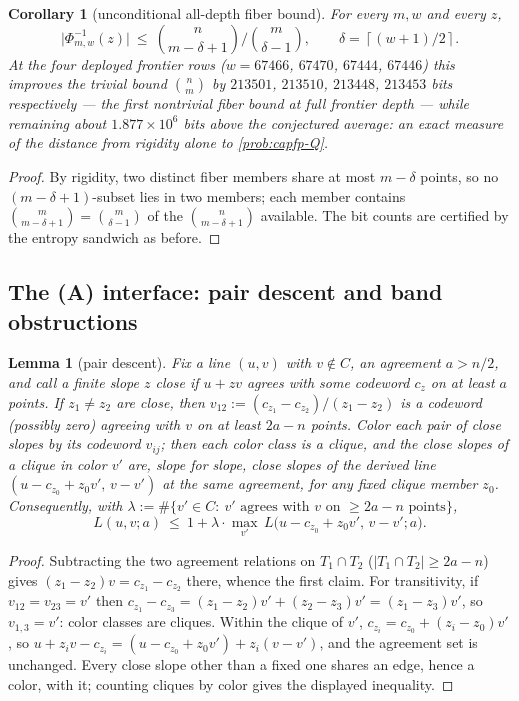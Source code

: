 \documentclass[11pt]{article}
\newtheorem{lemma}[lemma]{Lemma}
\newtheorem{corollary}[corollary]{Corollary}
\theoremstyle{definition}
\theoremstyle{remark}
\providecommand{\ceil}[1]{\left\lceil #1\right\rceil}
\begin{document}
\begin{corollary}[unconditional all-depth fiber bound]\label{cor:capfp-packing}
For every $m,w$ and every $z$,
\[
        \bigl|\Phi_{m,w}^{-1}(z)\bigr|\ \le\ \binom{n}{m-\delta+1}\Big/\binom{m}{\delta-1},
        \qquad \delta=\ceil{(w+1)/2}.
\]
At the four deployed frontier rows \textup($w=67466$, $67470$, $67444$, $67446$\textup) this improves the trivial bound $\binom nm$ by $213501$, $213510$, $213448$, $213453$ bits respectively --- the first nontrivial fiber bound at full frontier depth --- while remaining about $1.877\times10^6$ bits above the conjectured average: an exact measure of the distance from rigidity alone to \cref{prob:capfp-Q}.
\end{corollary}

\begin{proof}
By rigidity, two distinct fiber members share at most $m-\delta$ points, so no $(m-\delta+1)$-subset lies in two members; each member contains $\binom m{m-\delta+1}=\binom m{\delta-1}$ of the $\binom n{m-\delta+1}$ available.  The bit counts are certified by the entropy sandwich as before.
\end{proof}

\subsection{The \textup{(A)} interface: pair descent and band obstructions}

\begin{lemma}[pair descent]\label{lem:capfp-pair-descent}
Fix a line $(u,v)$ with $v\notin C$, an agreement $a>n/2$, and call a finite slope $z$ \emph{close} if $u+zv$ agrees with some codeword $c_z$ on at least $a$ points.  If $z_1\ne z_2$ are close, then $v_{12}:=(c_{z_1}-c_{z_2})/(z_1-z_2)$ is a codeword \textup(possibly zero\textup) agreeing with $v$ on at least $2a-n$ points.  Color each pair of close slopes by its codeword $v_{ij}$; then each color class is a clique, and the close slopes of a clique in color $v'$ are, slope for slope, close slopes of the derived line $(u-c_{z_0}+z_0v',\,v-v')$ at the same agreement, for any fixed clique member $z_0$.  Consequently, with $\lambda:=\#\{v'\in C:\ v'\text{ agrees with }v\text{ on }\ge2a-n\text{ points}\}$,
\[
        L(u,v;a)\ \le\ 1+\lambda\cdot\max_{v'}\,L\bigl(u-c_{z_0}+z_0v',\,v-v';a\bigr).
\]
\end{lemma}

\begin{proof}
Subtracting the two agreement relations on $T_1\cap T_2$ \textup($|T_1\cap T_2|\ge2a-n$\textup) gives $(z_1-z_2)v=c_{z_1}-c_{z_2}$ there, whence the first claim.  For transitivity, if $v_{12}=v_{23}=v'$ then $c_{z_1}-c_{z_3}=(z_1-z_2)v'+(z_2-z_3)v'=(z_1-z_3)v'$, so $v_{1,3}=v'$: color classes are cliques.  Within the clique of $v'$, $c_{z_i}=c_{z_0}+(z_i-z_0)v'$, so $u+z_iv-c_{z_i}=(u-c_{z_0}+z_0v')+z_i(v-v')$, and the agreement set is unchanged.  Every close slope other than a fixed one shares an edge, hence a color, with it; counting cliques by color gives the displayed inequality.
\end{proof}
\end{document}
